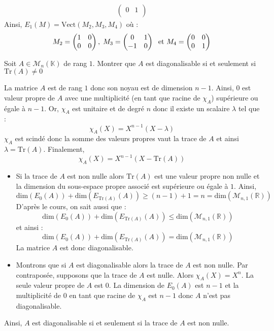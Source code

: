 \documentclass[a4paper,10pt]{report}
\begin{document}
\begin{enumerate}
\begin{itemize}
\begin{align*}
\begin{pmatrix}
0 & 1 \\ 
\end{pmatrix} 
\end{align*}
Ainsi, $E_1(M) = \textrm{Vect}(M_2,M_3,M_4)$ où :
$$ M_2 = \begin{pmatrix} 1 & 0 \\
0 & 0 \\ 
\end{pmatrix} , \; M_3= \begin{pmatrix}
0 & 1 \\
-1 & 0
\end{pmatrix} \; \hbox{ et } M_4 = \begin{pmatrix} 0 & 0 \\
0 & 1 \\ 
\end{pmatrix}  $$
\end{itemize}
\end{enumerate}

\begin{Exercice}{} Soit $A \in \mathcal{M}_{n}(\mathbb{K})$ de rang $1$. Montrer que $A$ est diagonalisable si et seulement si $\textrm{Tr}(A) \neq 0$ \end{Exercice}

\corr La matrice $A$ est de rang $1$ donc son noyau est de dimension $n-1$. Ainsi, $0$ est valeur propre de $A$ avec une multiplicité (en tant que racine de $\chi_A$) supérieure ou égale à $n-1$. Or, $\chi_A$ est unitaire et de degré $n$ donc il existe un scalaire $\lambda$ tel que :
$$ \chi_A(X)=X^{n-1}(X- \lambda)$$
$\chi_A$ est scindé donc la somme des valeurs propres vaut la trace de $A$ et ainsi $\lambda = \textrm{Tr}(A)$. Finalement,
$$ \chi_A(X)= X^{n-1}(X- \textrm{Tr}(A))$$
\begin{itemize}
\item Si la trace de $A$ est non nulle alors $\textrm{Tr}(A)$ est une valeur propre non nulle et la dimension du sous-espace propre associé est supérieure ou égale à $1$. Ainsi,
$$ \textrm{dim}(E_0(A))+ \textrm{dim}(E_{\textrm{Tr}(A)}(A)) \geq (n-1)+1 = n = \textrm{dim}(\mathcal{M}_{n,1}(\mathbb{R}))$$
D'après le cours, on sait aussi que :
$$ \textrm{dim}(E_0(A))+ \textrm{dim}(E_{\textrm{Tr}(A)}(A)) \leq \textrm{dim}(\mathcal{M}_{n,1}(\mathbb{R}))$$
et ainsi :
$$ \textrm{dim}(E_0(A))+ \textrm{dim}(E_{\textrm{Tr}(A)}(A)) = \textrm{dim}(\mathcal{M}_{n,1}(\mathbb{R}))$$
La matrice $A$ est donc diagonalisable.
\item Montrons que si $A$ est diagonalisable alors la trace de $A$ est non nulle. Par contraposée, supposons que la trace de $A$ est nulle. Alors $\chi_A(X)=X^n$. La seule valeur propre de $A$ est $0$. La dimension de $E_0(A)$ est $n-1$ et la multiplicité de $0$ en tant que racine de $\chi_A$ est $n-1$ donc $A$ n'est pas diagonalisable.
\end{itemize}
Ainsi, $A$ est diagonalisable si et seulement si la trace de $A$ est non nulle.
\end{document}
